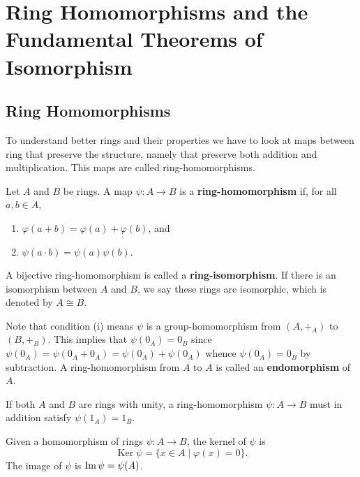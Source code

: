 \documentclass[11pt,a4paper]{article}
\begin{document}
\def\contador{Lesson 11}


\section{Ring Homomorphisms and the Fundamental Theorems of Isomorphism}

\subsection{Ring Homomorphisms}

To understand better rings and their properties we have to look at maps between ring that preserve the structure, namely that preserve both addition and multiplication.
This maps are called ring-homomorphisms.

\begin{defi}
    Let \(A\) and \(B\) be rings.
    A map \(\psi\colon A\to B\)  is a \textbf{ring-homomorphism} if, for all \(a,b\in A\),
\begin{enumerate}[label=(\roman*)]
    \item \(\varphi(a+b)=\varphi(a)+\varphi(b)\), and
    \item \(\psi(a\cdot b) = \psi(a)\psi(b)\).
\end{enumerate}
A   bijective ring-homomorphism is called a \textbf{ring-isomorphism}. 
If there is an isomorphism between \(A\) and \(B\), we say these rings are isomorphic, which is denoted by \(A\cong B\).
\end{defi}

Note that condition (i) means \(\psi\) is a group-homomorphism from \((A,+_A)\) to \((B,+_B)\).
This implies that \(\psi(0_A) = 0_B\) since \(\psi(0_A) = \psi(0_A+0_A) = \psi(0_A) + \psi(0_A)\) whence \(\psi(0_A) = 0_B\) by subtraction.
A ring-homomorphism from \(A\) to \(A\) is called an \textbf{endomorphism} of \(A\).

\begin{rem}
    If both \(A\) and \(B\) are rings with unity, a ring-homomorphism  \(\psi\colon A\to B\) must in addition satisfy \(\psi(1_A) = 1_B\).
\end{rem}

Given a homomorphism of rings \(\psi\colon A\to B\), the kernel of \(\psi\) is 
\[\operatorname{Ker}\psi =\{x \in A \mid \varphi(x)=0\}.\]
The image of \(\psi\) is \(\operatorname{Im} \psi = \psi(A) \).
\end{document}
